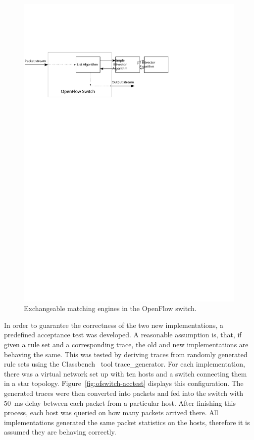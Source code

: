 \documentclass[a4paper,
		12pt,
		parskip=full,
		titlepage
		]{scrartcl}
\begin{document}
\begin{figure}
\centering
\includegraphics[height=0.2\textheight]{images/ofswitch}
\caption{Exchangeable matching engines in the OpenFlow switch.}
\label{fig:ofswitch}
\end{figure}

In order to guarantee the correctness of the two new implementations, a predefined acceptance test was developed.
A reasonable assumption is, that, if given a rule set and a corresponding trace, 
the old and new implementations are behaving the same.
This was tested by deriving traces from randomly generated rule sets using 
the Classbench~\cite{classbench_website} tool \textsf{trace\_generator}.
For each implementation, there was a virtual network set up with ten hosts and a switch connecting them in a star topology.
Figure~\ref{fig:ofswitch-acctest} displays this configuration.
The generated traces were then converted into packets and fed into the switch with 50\ ms delay between each packet from a particular host.
After finishing this process, each host was queried on how many packets arrived there.
All implementations generated the same packet statistics on the hosts, therefore it is assumed they are behaving correctly.
\end{document}
